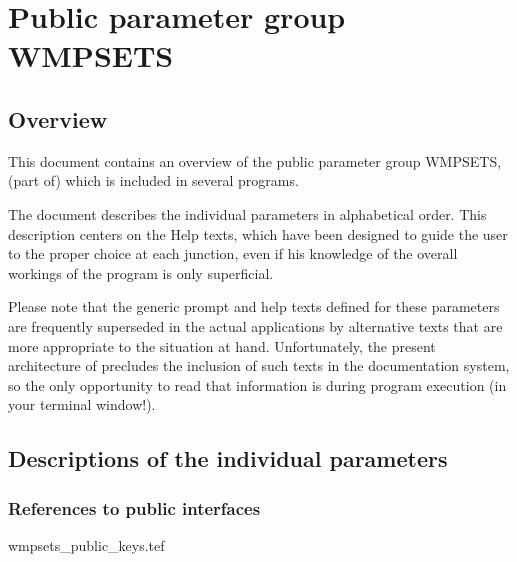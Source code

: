 
\chapter{ Public parameter group WMPSETS}
\tableofcontents


\section{ Overview}

	This document contains an overview of the public parameter group
WMPSETS, (part of) which is included in several \NEWSTAR programs.



	The
document describes the individual parameters in alphabetical order. This
description centers on the Help texts, which have been designed to guide the
user to the proper choice at each junction, even if his knowledge of the
overall workings of the program is only superficial.

	Please note that the generic prompt and help texts defined for these
parameters are frequently superseded in the actual applications by alternative
texts that are more appropriate to the situation at hand. Unfortunately, the
present architecture of \NEWSTAR precludes the inclusion of such texts in the
documentation system, so the only opportunity to read that information is
during program execution (in your terminal window!).


\section{ Descriptions of the individual parameters}
\label{.descriptions}

\subsection{ References to public interfaces}
\label{.public}

 {wmpsets_public_keys.tef}
